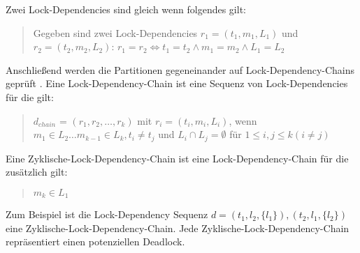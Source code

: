 Zwei Lock-Dependencies sind gleich wenn folgendes
gilt:\autocite[vgl.][8]{MagicLock}
\begin{quote}
  Gegeben sind zwei Lock-Dependencies \emph{$r_1 = (t_1, m_1, L_1)$} und
  \emph{$r_2 = (t_2, m_2, L_2)$}: $r_1 = r_2 \Leftrightarrow t_1 = t_2 \land m_1
  = m_2 \land L_1 = L_2 $
\end{quote}
Anschließend werden die Partitionen gegeneinander auf Lock-Dependency-Chains
geprüft \autocite[vgl.][8]{MagicLock}. Eine Lock-Dependency-Chain ist eine
Sequenz von Lock-Dependencies für die gilt:\autocite[vgl.][3]{MagicLock}
\begin{quote}
  \textbf{$d_{chain}$} = $(r_1, r_2, \dots , r_k)$ mit $r_i = (t_i, m_i, L_i)$,
  wenn $m_1 \in L_2 \dots m_{k-1} \in L_k, t_i \neq t_j$ und $L_i \cap L_j =
  \emptyset$ für $1 \leq i, j \leq k (i \neq j)$
\end{quote}
Eine Zyklische-Lock-Dependency-Chain ist eine Lock-Dependency-Chain für die
zusätzlich gilt:\autocite[vgl.][3]{MagicLock}
\begin{quote}
  $m_k \in L_1$
\end{quote}
Zum Beispiel ist die Lock-Dependency Sequenz \emph{$d = (t_1, l_2, \{l_1\}),
(t_2, l_1, \{l_2\})$} eine Zyklische-Lock-Dependency-Chain. Jede
Zyklische-Lock-Dependency-Chain repräsentiert einen potenziellen
Deadlock\autocite[vgl.][3]{MagicLock}.